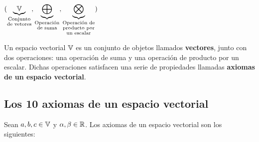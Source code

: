 \setcounter{equation}{0}

\begin{center}
    $(\underbrace{\mathbb{V}}_{\substack{\text{Conjunto}\\\text{de vetores}}}, \underbrace{\bigoplus}_{\substack{\text{Operación}\\\text{de suma}}}, \underbrace{\bigotimes}_{\substack{\text{Operación de}\\\text{producto por}\\\text{un escalar}}})$
\end{center}

\begin{definition}
{
    Un espacio vectorial $\mathbb{V}$ es un conjunto de objetos llamados \textbf{vectores}, junto con dos operaciones: una operación de suma y una operación de producto por un escalar. Dichas operaciones satisfacen una serie de propiedades llamadas \textbf{axiomas de un espacio vectorial}.
}
\end{definition}

\subsection{Los 10 axiomas de un espacio vectorial}
\label{sec:axiomas_espacio_vectorial}

Sean $a, b, c \in \mathbb{V}$ y $\alpha, \beta \in \mathbb{R}$. Los axiomas de un espacio vectorial son los siguientes:

